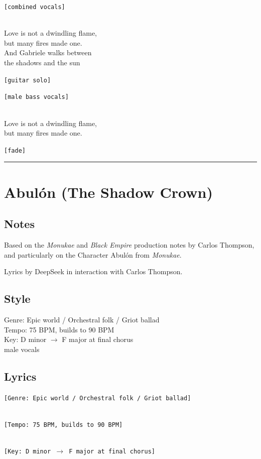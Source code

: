 \texttt{{[}combined\ vocals{]}}\strut \\
Love is not a dwindling flame,\\
but many fires made one.\\
And Gabriele walks between\\
the shadows and the sun

\texttt{{[}guitar\ solo{]}}

\texttt{{[}male\ bass\ vocals{]}}\strut \\
Love is not a dwindling flame,\\
but many fires made one.

\texttt{{[}fade{]}}

\begin{center}\rule{0.5\linewidth}{0.5pt}\end{center}

\section{Abulón (The Shadow Crown)}\label{abuluxf3n-the-shadow-crown}

\subsection{Notes}\label{notes-11}

Based on the \emph{Monukae} and \emph{Black Empire} production notes by
Carlos Thompson, and particularly on the Character Abulón from
\emph{Monukae}.

Lyrics by DeepSeek in interaction with Carlos Thompson.

\subsection{Style}\label{style-11}

Genre: Epic world / Orchestral folk / Griot ballad\\
Tempo: 75 BPM, builds to 90 BPM\\
Key: D minor \(\to\) F major at final chorus\\
male vocals

\subsection{Lyrics}\label{lyrics-11}

\texttt{{[}Genre:\ Epic\ world\ /\ Orchestral\ folk\ /\ Griot\ ballad{]}}\strut \\
\texttt{{[}Tempo:\ 75\ BPM,\ builds\ to\ 90\ BPM{]}}\strut \\
\texttt{{[}Key:\ D\ minor\ \(\to\)\ F\ major\ at\ final\ chorus{]}}


